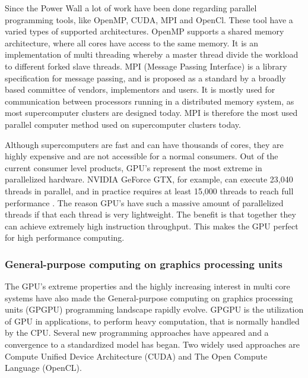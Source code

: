 Since the Power Wall a lot of work have been done regarding parallel programming tools, like OpenMP, CUDA, MPI and OpenCl. These tool have a varied types of supported architectures. OpenMP supports a shared memory architecture, where all cores have access to the same memory. It is an implementation of multi threading whereby a master thread divide the workload to different forked slave threads. MPI (Message Passing Interface) is a library specification for message passing, and is proposed as a standard by a broadly based committee of vendors, implementors and users. It is mostly used for communication between processors running in a distributed memory system, as most supercomputer clusters are designed today. MPI is therefore the most used parallel computer method used on supercomputer clusters today.


Although supercomputers are fast and can have thousands of cores, they are highly expensive and are not accessible for a normal consumers. Out of the current consumer level products, GPU's represent the most extreme in parallelized hardware. NVIDIA GeForce GTX, for example, can execute 23,040 threads in parallel, and in practice requires at least 15,000 threads to reach full performance \citep{karras2012}. The reason GPU's have such a massive amount of parallelized threads if that each thread is very lightweight. The benefit is that together they can achieve extremely high instruction throughput. This makes the GPU perfect for high performance computing.


\subsubsection{General-purpose computing on graphics processing units} %
\label{ssub:general_purpose_computing_on_graphics_processing_units}


The GPU's extreme properties and the highly increasing interest in multi core systems have also made the General-purpose computing on graphics processing units (GPGPU) programming landscape rapidly evolve. GPGPU is the utilization of GPU in applications, to perform heavy computation, that is normally handled by the CPU. Several new programming approaches have appeared and a convergence to a standardized model has began. Two widely used approaches are Compute Unified Device Architecture (CUDA) and The Open Compute Language (OpenCL).


